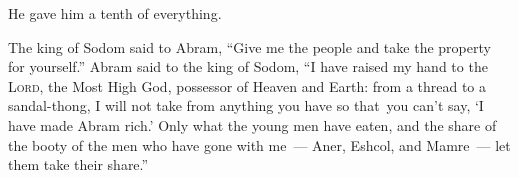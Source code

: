 \begin{inparaenum}
    
    
    {\noindent He gave him a tenth of everything.}
    
     The king of Sodom said to Abram, ``Give me the people and take the property for yourself.''%
     Abram said to the king of Sodom, ``I have raised my hand to the \textsc{Lord}, the Most High God, possessor of Heaven and Earth:%
     from a thread to a sandal-thong, I will not take from anything you have so that\understood\ you can't say, `I have made Abram rich.'%
     Only what the young men have eaten, and the share of the booty of the men who have gone with me~--- Aner, Eshcol, and Mamre~--- let them take their share.''%
\end{inparaenum}
